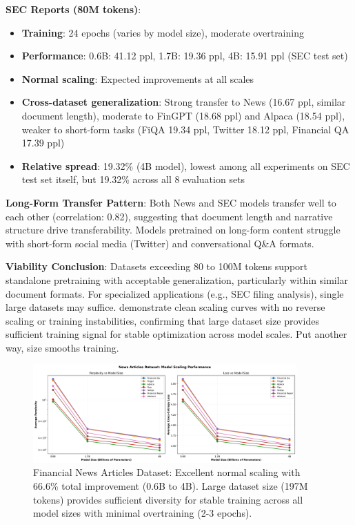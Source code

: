 \textbf{SEC Reports (80M tokens)}:
\begin{itemize}
\item \textbf{Training}: 24 epochs (varies by model size), moderate overtraining
\item \textbf{Performance}: 0.6B: 41.12 ppl, 1.7B: 19.36 ppl, 4B: 15.91 ppl (SEC test set)
\item \textbf{Normal scaling}: Expected improvements at all scales
\item \textbf{Cross-dataset generalization}: Strong transfer to News (16.67 ppl, similar document length), moderate to FinGPT (18.68 ppl) and Alpaca (18.54 ppl), weaker to short-form tasks (FiQA 19.34 ppl, Twitter 18.12 ppl, Financial QA 17.39 ppl)
\item \textbf{Relative spread}: 19.32\% (4B model), lowest among all experiments on SEC test set itself, but 19.32\% across all 8 evaluation sets
\end{itemize}

\textbf{Long-Form Transfer Pattern}: Both News and SEC models transfer well to each other (correlation: 0.82), suggesting that document length and narrative structure drive transferability. Models pretrained on long-form content struggle with short-form social media (Twitter) and conversational Q\&A formats.

\textbf{Viability Conclusion}: Datasets exceeding 80 to 100M tokens support standalone pretraining with acceptable generalization, particularly within similar document formats. For specialized applications (e.g., SEC filing analysis), single large datasets may suffice.  demonstrate clean scaling curves with no reverse scaling or training instabilities, confirming that large dataset size provides sufficient training signal for stable optimization across model scales. Put another way, size smooths training.

\begin{figure}[h]
\centering
\includegraphics[width=0.9\textwidth]{figures/scaling_news_articles.png}
\caption[Financial News Dataset: Scaling Behavior]{Financial News Articles Dataset: Excellent normal scaling with 66.6\% total improvement (0.6B to 4B). Large dataset size (197M tokens) provides sufficient diversity for stable training across all model sizes with minimal overtraining (2-3 epochs).}
\label{fig:scaling_news_articles}
\end{figure}

